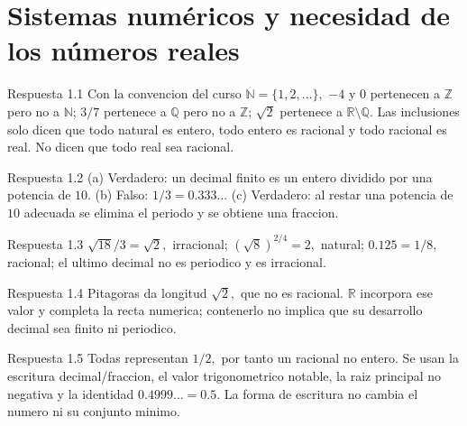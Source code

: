 \documentclass[10pt,a4paper,oneside,openany]{book}
\begin{document}
\section{Sistemas numéricos y necesidad de los números reales}
\begin{PSevenAnswerFixed}{Respuesta 1.1}
Con la convencion del curso \(\mathbb{N}=\{1,2,\ldots \},\) \(-4\) y \(0\) pertenecen a \(\mathbb{Z}\) pero no a \(\mathbb{N}\); \(3/7\) pertenece a \(\mathbb{Q}\) pero no a \(\mathbb{Z}\); \(\sqrt{2}\) pertenece a \(\mathbb{R}\setminus \mathbb{Q}\). Las inclusiones solo dicen que todo natural es entero, todo entero es racional y todo racional es real. No dicen que todo real sea racional.
\end{PSevenAnswerFixed}
\begin{PSevenAnswerFixed}{Respuesta 1.2}
(a) Verdadero: un decimal finito es un entero dividido por una potencia de \(10\). (b) Falso: \(1/3=0.333..\). (c) Verdadero: al restar una potencia de \(10\) adecuada se elimina el periodo y se obtiene una fraccion.
\end{PSevenAnswerFixed}
\begin{PSevenAnswerFixed}{Respuesta 1.3}
\(\sqrt{18}/3=\sqrt{2},\) irracional; \((\sqrt{8})^{2/4}=2,\) natural; \(0.125=1/8,\) racional; el ultimo decimal no es periodico y es irracional.
\end{PSevenAnswerFixed}
\begin{PSevenAnswerFixed}{Respuesta 1.4}
Pitagoras da longitud \(\sqrt{2},\) que no es racional. \(\mathbb{R}\) incorpora ese valor y completa la recta numerica; contenerlo no implica que su desarrollo decimal sea finito ni periodico.
\end{PSevenAnswerFixed}
\begin{PSevenAnswerFixed}{Respuesta 1.5}
Todas representan \(1/2,\) por tanto un racional no entero. Se usan la escritura decimal/fraccion, el valor trigonometrico notable, la raiz principal no negativa y la identidad \(0.4999\ldots =0.5\). La forma de escritura no cambia el numero ni su conjunto minimo.
\end{PSevenAnswerFixed}
\end{document}
